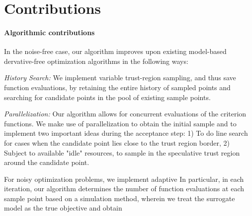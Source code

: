 \section{Contributions}
\paragraph{Algorithmic contributions} In the noise-free case, our algorithm improves upon existing model-based dervative-free optimization algorithms in the following ways:


\textit{History Search:} We implement variable trust-region sampling, and thus save function evaluations, by retaining the entire history of sampled points and searching for candidate points in the pool of existing sample points.


\textit{Parallelization:} Our algorithm allows for concurrent evaluations of the criterion functions. We make use of parallelization to obtain the initial sample and to implement two important ideas during the acceptance step: 1) To do line search for cases when the candidate point lies close to the trust region border, 2) Subject to available "idle" resources, to sample in the speculative trust region around the candidate point.

For noisy optimization problems, we implement adaptive  In particular, in each iteration, our algorithm determines the number of function evaluations at each sample point based on a simulation method, wherein we treat the surrogate model as the true objective and obtain

